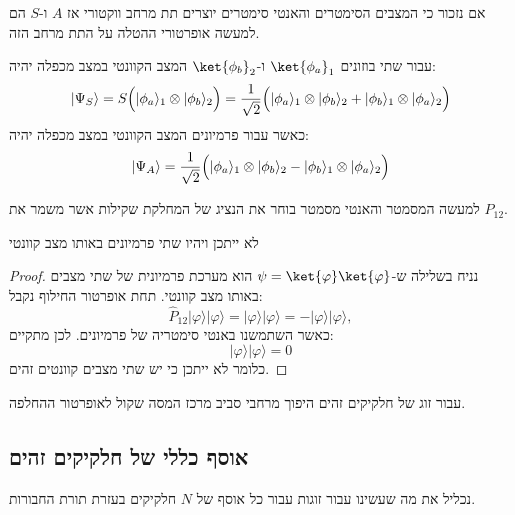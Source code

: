 \documentclass{tstextbook}
\begin{document}
\begin{remark}
אם נזכור כי המצבים הסימטרים והאנטי סימטרים יוצרים תת מרחב ווקטורי אז \(A\) ו-\(S\) הם למעשה אופרטורי ההטלה על התת מרחב הזה. 

\end{remark}
\begin{proposition}
עבור שתי בוזונים \(\ket{\phi_{a}}_{1}\) ו-\(\ket{\phi_{b}}_{2}\) המצב הקוונטי במצב מכפלה יהיה:
$$|\Psi_{S}\rangle=S{\Bigl(}|\phi_{a}\rangle_{1}\otimes|\phi_{b}\rangle_{2}{\Bigr)}={\frac{1}{\sqrt{2}}}{\Bigl(}|\phi_{a}\rangle_{1}\otimes|\phi_{b}\rangle_{2}+|\phi_{b}\rangle_{1}\otimes|\phi_{a}\rangle_{2}{\Bigr)}$$
כאשר עבור פרמיונים המצב הקוונטי במצב מכפלה יהיה:
$$|\Psi_{A}\rangle=\frac{1}{\sqrt{2}}\Bigl(|\phi_{a}\rangle_{1}\otimes|\phi_{b}\rangle_{2}-|\phi_{b}\rangle_{1}\otimes|\phi_{a}\rangle_{2}\Bigr)$$

\end{proposition}
\begin{remark}
למעשה המסמטר והאנטי מסמטר בוחר את הנציג של המחלקת שקילות אשר משמר את \(P_{12}\). 

\end{remark}
\begin{proposition}
לא ייתכן ויהיו שתי פרמיונים באותו מצב קוונטי

\end{proposition}
\begin{proof}
נניח בשלילה ש-\(\psi=\ket{\varphi}\ket{\varphi}\) הוא מערכת פרמיונית של שתי מצבים באותו מצב קוונטי. תחת אופרטור החילוף נקבל:
$$\hat{P}_{12}|\varphi\rangle|\varphi\rangle=|\varphi\rangle|\varphi\rangle=-|\varphi\rangle|\varphi\rangle,$$
כאשר השתמשנו באנטי סימטריה של פרמיונים. לכן מתקיים:
$$|\varphi\rangle|\varphi\rangle=0$$
כלומר לא ייתכן כי יש שתי מצבים קוונטים זהים. 

\end{proof}
\begin{proposition}
עבור זוג של חלקיקים זהים היפוך מרחבי סביב מרכז המסה שקול לאופרטור ההחלפה.

\end{proposition}
\subsection{אוסף כללי של חלקיקים זהים}

נכליל את מה שעשינו עבור זוגות עבור כל אוסף של \(N\) חלקיקים בעזרת תורת החבורות.
\end{document}
